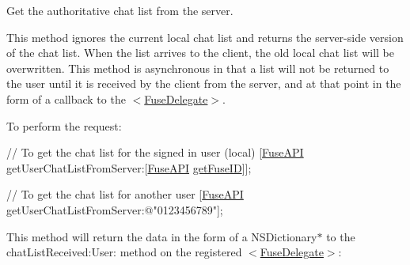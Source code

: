 Get the authoritative chat list from the server. 

This method ignores the current local chat list and returns the server-\/side version of the chat list. When the list arrives to the client, the old local chat list will be overwritten. This method is asynchronous in that a list will not be returned to the user until it is received by the client from the server, and at that point in the form of a callback to the $<$\hyperlink{protocol_fuse_delegate-p}{Fuse\+Delegate}$>$.

To perform the request\+:


\begin{DoxyCode}
\textcolor{comment}{// To get the chat list for the signed in user (local)}
[\hyperlink{interface_fuse_a_p_i}{FuseAPI} getUserChatListFromServer:[\hyperlink{interface_fuse_a_p_i}{FuseAPI} \hyperlink{interface_fuse_a_p_i_ab483c2a3f4439aad8e19200cf24ff731}{getFuseID}]];

\textcolor{comment}{// To get the chat list for another user}
[\hyperlink{interface_fuse_a_p_i}{FuseAPI} getUserChatListFromServer:\textcolor{stringliteral}{@"0123456789"}];
\end{DoxyCode}


This method will return the data in the form of a N\+S\+Dictionary$\ast$ to the chat\+List\+Received\+:\+User\+: method on the registered $<$\hyperlink{protocol_fuse_delegate-p}{Fuse\+Delegate}$>$\+:





